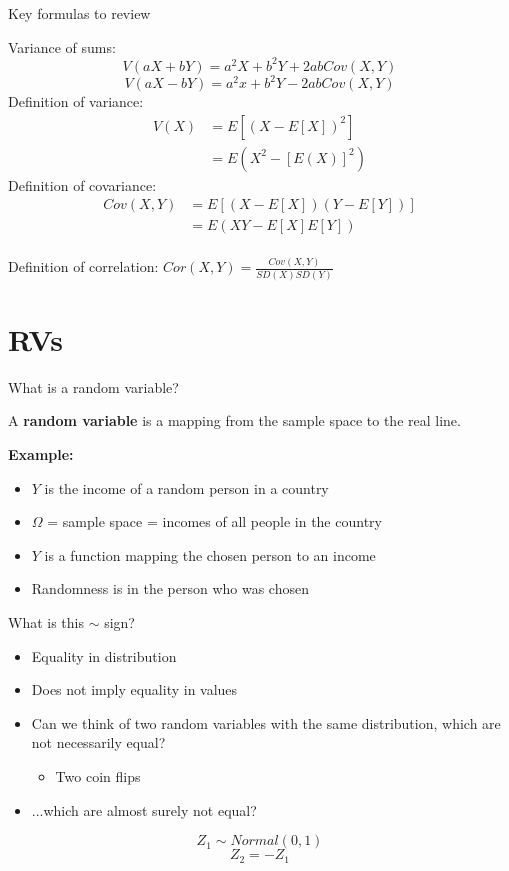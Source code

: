 \documentclass{beamer}
\begin{document}
\begin{frame}{Key formulas to review}
\begin{footnotesize}
Variance of sums:
$$V(aX+bY)=a^2X+b^2Y+2abCov(X,Y)$$
$$V(aX-bY)=a^2x+b^2Y-2abCov(X,Y)$$
\medskip
Definition of variance:
\begin{align*}
V(X)&=E\left[\left(X-E[X]\right)^2\right] \\
&=E\left(X^2-\left[E(X)\right]^2\right)
\end{align*}
\medskip
Definition of covariance:
\begin{align*}
Cov(X,Y)&=E\left[\left(X-E[X]\right)\left(Y-E[Y]\right)\right] \\
&=E\left(XY-E[X]E[Y]\right)
\end{align*} \\
\medskip
Definition of correlation: $Cor(X,Y)=\frac{Cov(X,Y)}{SD(X)SD(Y)}$
\end{footnotesize}
\end{frame}

\section{RVs}
\begin{frame}{What is a random variable?}
\begin{definition}
A \textbf{random variable} is a mapping from the sample space to the real line.
\end{definition}
\textbf{Example:}
\begin{itemize}
  \item $Y$ is the income of a random person in a country
  \item $\Omega$ = sample space = incomes of all people in the country
  \item $Y$ is a function mapping the chosen person to an income
  \item Randomness is in the person who was chosen
\end{itemize}
\end{frame}

\begin{frame}{What is this $\sim$ sign?}
\begin{itemize}
\item Equality in distribution
\item Does not imply equality in values
\pause
\item Can we think of two random variables with the same distribution, which are not necessarily equal?
\pause
\begin{itemize}
\item Two coin flips
\end{itemize}
\pause
\item ...which are almost surely not equal?
\end{itemize}
\pause
$$Z_1\sim Normal(0,1)$$
$$Z_2=-Z_1$$
\end{frame}
\end{document}
